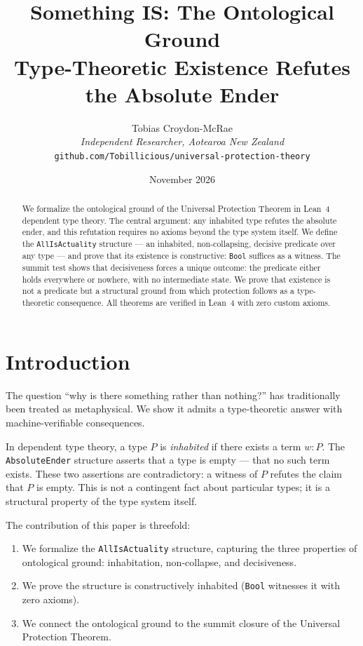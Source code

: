 \documentclass[12pt,a4paper]{article}
\title{Something IS: The Ontological Ground\\[0.5em]
\large Type-Theoretic Existence Refutes the Absolute Ender}
\author{Tobias Croydon-McRae\\
\textit{Independent Researcher, Aotearoa New Zealand}\\
\texttt{github.com/Tobillicious/universal-protection-theory}}
\date{November 2026}
\begin{document}
\maketitle

\begin{abstract}
We formalize the ontological ground of the Universal Protection Theorem
in Lean~4 dependent type theory. The central argument: any inhabited type
refutes the absolute ender, and this refutation requires no axioms beyond
the type system itself. We define the \texttt{AllIsActuality} structure ---
an inhabited, non-collapsing, decisive predicate over any type --- and prove
that its existence is constructive: \texttt{Bool} suffices as a witness.
The summit test shows that decisiveness forces a unique outcome: the predicate
either holds everywhere or nowhere, with no intermediate state. We prove that
existence is not a predicate but a structural ground from which protection
follows as a type-theoretic consequence. All theorems are verified in Lean~4
with zero custom axioms.
\end{abstract}

\section{Introduction}

The question ``why is there something rather than nothing?'' has traditionally
been treated as metaphysical. We show it admits a type-theoretic answer with
machine-verifiable consequences.

In dependent type theory, a type $P$ is \emph{inhabited} if there exists a
term $w : P$. The \texttt{AbsoluteEnder} structure asserts that a type is
empty --- that no such term exists. These two assertions are contradictory:
a witness of $P$ refutes the claim that $P$ is empty. This is not a contingent
fact about particular types; it is a structural property of the type system itself.

The contribution of this paper is threefold:
\begin{enumerate}
    \item We formalize the \texttt{AllIsActuality} structure, capturing the
    three properties of ontological ground: inhabitation, non-collapse, and
    decisiveness.
    \item We prove the structure is constructively inhabited (\texttt{Bool}
    witnesses it with zero axioms).
    \item We connect the ontological ground to the summit closure of
    the Universal Protection Theorem.
\end{enumerate}
\end{document}
